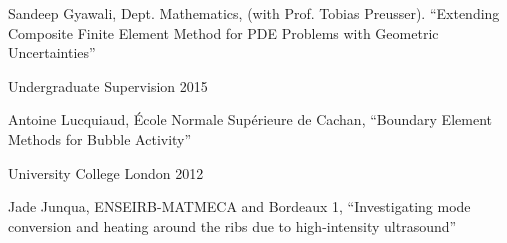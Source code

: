 \documentclass[11pt, a4paper]{awesome-cv}
\begin{document}
\begin{cventries}
{\begin{cvitems}
\item Sandeep Gyawali, Dept. Mathematics, (with Prof. Tobias Preusser). %
\enquote{Extending Composite Finite Element Method for PDE Problems with Geometric Uncertainties}
\end{cvitems}}
%
%
{Undergraduate Supervision}%
{}%
{2015}%
{\begin{cvitems}%
\item Antoine Lucquiaud, \'{E}cole Normale Sup\'{e}rieure de Cachan, \enquote{Boundary Element Methods for Bubble Activity}%
\end{cvitems}}%
{University College London}%
{}%
{2012}%
{\begin{cvitems}%
\item Jade Junqua, ENSEIRB-MATMECA and Bordeaux 1, \enquote{Investigating mode conversion and heating around the ribs due to high-intensity ultrasound}
\end{cvitems}}%
%
%
%
%
%
\end{cventries}
\end{document}
